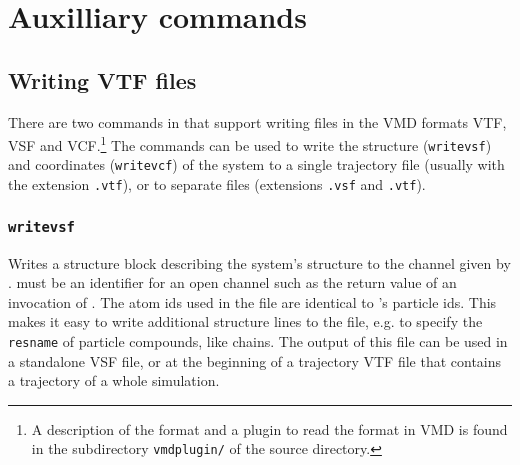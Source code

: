 \chapter{Auxilliary commands}
\label{chap:aux}

\section{Writing VTF files}

There are two commands in \es{} that support writing files in the VMD
formats VTF, VSF and VCF.\footnote{A description of the format and a
  plugin to read the format in VMD is found in the subdirectory
  \texttt{vmdplugin/} of the \es{} source directory.} The commands can
be used to write the structure (\texttt{writevsf}) and coordinates
(\texttt{writevcf}) of the system to a single trajectory file (usually
with the extension \texttt{.vtf}), or to separate files (extensions
\texttt{.vsf} and \texttt{.vtf}).

\subsection{\texttt{writevsf}}

{   
  }

Writes a structure block describing the system's structure to the
channel given by .  must be an
identifier for an open channel such as the return value of an
invocation of . The atom ids used in the file are
identical to \es's particle ids.  This makes it easy to write
additional structure lines to the file, e.g. to specify the
\texttt{resname} of particle compounds, like chains.  The output of
this file can be used in a standalone VSF file, or at the beginning of
a trajectory VTF file that contains a trajectory of a whole
simulation.

